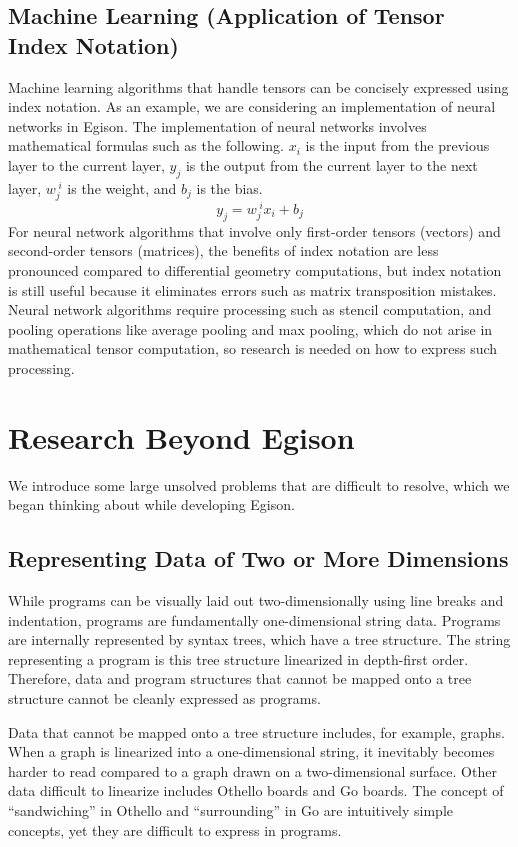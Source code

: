 \subsection{Machine Learning (Application of Tensor Index Notation)}

Machine learning algorithms that handle tensors can be concisely expressed using index notation.
As an example, we are considering an implementation of neural networks in Egison.
The implementation of neural networks involves mathematical formulas such as the following.
$x_i$ is the input from the previous layer to the current layer, $y_j$ is the output from the current layer to the next layer, $w^{\;i}_{j}$ is the weight, and $b_j$ is the bias.
\[y_j = w^{\;i}_j x_i + b_j \]
For neural network algorithms that involve only first-order tensors (vectors) and second-order tensors (matrices), the benefits of index notation are less pronounced compared to differential geometry computations, but index notation is still useful because it eliminates errors such as matrix transposition mistakes.
Neural network algorithms require processing such as stencil computation, and pooling operations like average pooling and max pooling, which do not arise in mathematical tensor computation, so research is needed on how to express such processing.

\section{Research Beyond Egison}

We introduce some large unsolved problems that are difficult to resolve, which we began thinking about while developing Egison.

\subsection{Representing Data of Two or More Dimensions}

While programs can be visually laid out two-dimensionally using line breaks and indentation, programs are fundamentally one-dimensional string data.
Programs are internally represented by syntax trees, which have a tree structure.
The string representing a program is this tree structure linearized in depth-first order.
Therefore, data and program structures that cannot be mapped onto a tree structure cannot be cleanly expressed as programs.

Data that cannot be mapped onto a tree structure includes, for example, graphs.
When a graph is linearized into a one-dimensional string, it inevitably becomes harder to read compared to a graph drawn on a two-dimensional surface.
Other data difficult to linearize includes Othello boards and Go boards.
The concept of ``sandwiching'' in Othello and ``surrounding'' in Go are intuitively simple concepts, yet they are difficult to express in programs.

